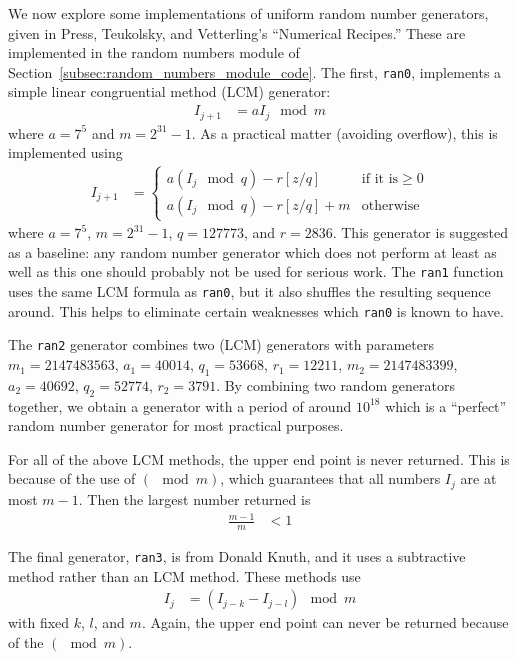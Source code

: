 \documentclass[twocolumn]{myarticle}
\begin{document}
We now explore some implementations of uniform random number generators, given in Press, Teukolsky, and Vetterling's ``Numerical Recipes.''
These are implemented in the random numbers module of Section~\ref{subsec:random_numbers_module_code}.
The first, \texttt{ran0}, implements a simple linear congruential method (LCM) generator:
\begin{align}
    I_{j+1} &= a I_j \mod m
\end{align}
where $ a = 7^5 $ and $ m = 2^{31}-1 $.
As a practical matter (avoiding overflow), this is implemented using
\begin{align}
I_{j+1} &= \begin{cases} a\left(I_j \mod q\right) - r[z/q] & \text{if it is} \geq 0 \\ a\left( I_j \mod q \right) - r[z/q] + m & \text{otherwise} \end{cases}
\end{align}
where $ a = 7^5 $, $ m = 2^{31} - 1 $, $ q = 127773 $, and $ r = 2836 $.
This generator is suggested as a baseline: any random number generator which does not perform at least as well as this one should probably not be used for serious work.
The \texttt{ran1} function uses the same LCM formula as \texttt{ran0}, but it also shuffles the resulting sequence around.
This helps to eliminate certain weaknesses which \texttt{ran0} is known to have.

The \texttt{ran2} generator combines two (LCM) generators with parameters $ m_1 = 2147483563 $, $ a_1 = 40014 $, $ q_1 = 53668 $, $ r_1 = 12211 $, $ m_2 = 2147483399 $, $ a_2 = 40692 $, $ q_2 = 52774 $, $ r_2 = 3791 $.
By combining two random generators together, we obtain a generator with a period of around $ 10^{18} $ which is a ``perfect'' random number generator for most practical purposes.

For all of the above LCM methods, the upper end point is never returned.
This is because of the use of $ (\mod m )$, which guarantees that all numbers $ I_j $ are at most $ m - 1 $.
Then the largest number returned is
\begin{align}
    \frac{m-1}{m} &< 1
\end{align}

The final generator, \texttt{ran3}, is from Donald Knuth, and it uses a subtractive method rather than an LCM method.
These methods use
\begin{align}
    I_j &= \left( I_{j-k} - I_{j-l} \right) \mod m
\end{align}
with fixed $ k $, $ l $, and $ m $.
Again, the upper end point can never be returned because of the $ (\mod m) $.
\end{document}
